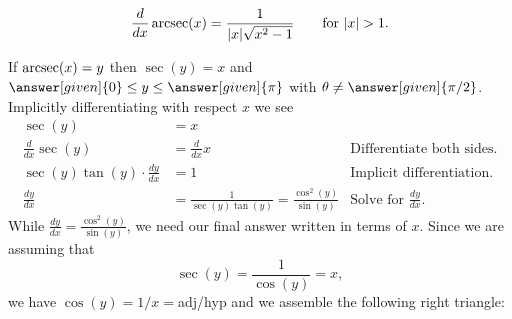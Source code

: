 \documentclass{ximera}
\begin{document}
\begin{theorem}
\[
\frac{d}{dx} \arcsec(x) = \frac{1}{|x|\sqrt{x^2-1}}\qquad\text{for $|x|>1$.}
\]
\begin{explanation} 
  If
\(
\operatorname{arcsec}(x) = y
\)
then $\sec(y) = x$ and $\answer[given]{0}\le y\le
\answer[given]{\pi}$ with $\theta\ne \answer[given]{\pi/2}$.  Implicitly
differentiating with respect $x$ we see
\begin{align*}
\sec(y) &= x\\
\frac{d}{dx} \sec(y) &= \frac{d}{dx} x                     &\text{Differentiate both sides.}\\
\sec(y)\tan(y) \cdot \frac{dy}{dx} &= 1     &\text{Implicit differentiation.}\\
\frac{dy}{dx} &= \frac{1}{\sec(y)\tan(y)}=\frac{\cos^2(y)}{\sin(y)} &\text{Solve for $\frac{dy}{dx}$}.
\end{align*}
While $\frac{dy}{dx} = \frac{\cos^2(y)}{\sin(y)}$, we need our final
answer written in terms of $x$. Since we are assuming that
\[
\sec(y) = \frac{1}{\cos(y)}= x,
\]
we have $\cos(y)=1/x=$adj/hyp and we assemble the following right triangle:
    \begin{image}[2in]
    \end{image}
    

\end{explanation}
\end{theorem}
\end{document}
